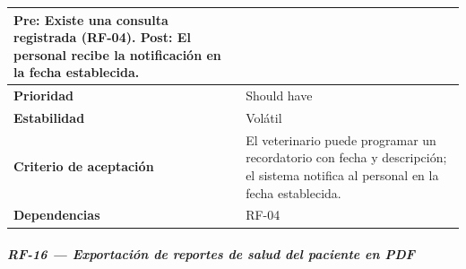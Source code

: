 \documentclass[
]{article}
\begin{document}
{\begin{longtable}[]{|
  >{\raggedright\arraybackslash}p{}|
  >{\raggedright\arraybackslash}p{}|}
\begin{minipage}[t]{\linewidth}
Pre: Existe una consulta registrada (RF-04). Post: El personal recibe la notificación en la fecha establecida.
\end{minipage} \\
\hline
\textbf{Prioridad} & \begin{minipage}[t]{\linewidth}\raggedright
Should have
\end{minipage} \\
\hline
\textbf{Estabilidad} & \begin{minipage}[t]{\linewidth}\raggedright
Volátil
\end{minipage} \\
\hline
\textbf{Criterio de aceptación} &
\begin{minipage}[t]{\linewidth}\raggedright
El veterinario puede programar un recordatorio con fecha y descripción; el sistema notifica al personal en la fecha establecida.
\end{minipage} \\
\hline
\textbf{Dependencias} & \begin{minipage}[t]{\linewidth}\raggedright
RF-04
\end{minipage} \\
\hline
\end{longtable}
}

\subparagraph{RF-16 --- Exportación de reportes de salud del paciente en PDF}\label{rf-16-exportaci-n-de-reportes-de-salud-del-pac}
\end{document}
